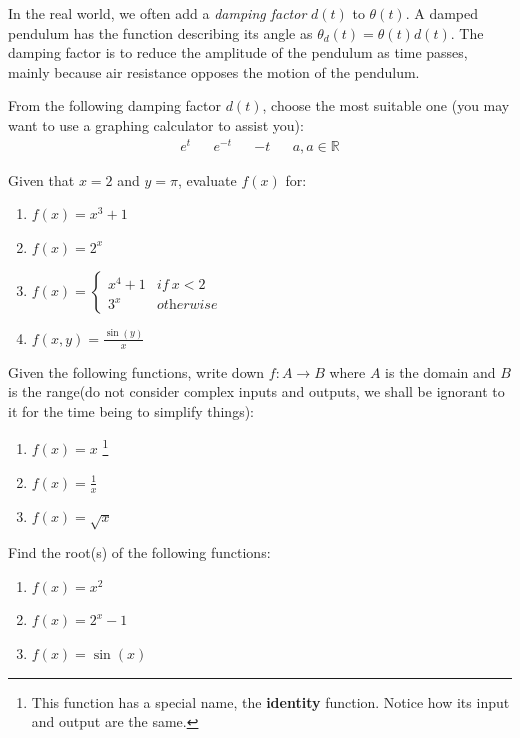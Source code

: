 In the real world, we often add a \textit{damping factor} \(d(t)\) to \(\theta(t)\). A damped pendulum has the function describing its angle as \(\theta_d(t)=\theta(t)d(t)\). The damping factor is to reduce the amplitude of the pendulum as time passes, mainly because air resistance opposes the motion of the pendulum. 
\begin{challenge}
  From the following damping factor \(d(t)\), choose the most suitable one (you may want to use a graphing calculator to assist you):
  \begin{align*}
    e^t && e^{-t} && -t && a, a\in \mathbb{R}
  \end{align*}
\end{challenge}

\begin{problem}
  Given that \(x=2\) and \(y=\pi\), evaluate \(f(x)\) for:
  \begin{enumerate}[label=\alph*)]
    \item{\(f(x)=x^3+1\)}
    \item{\(f(x)=2^x\)}
    \item{\(f(x)= \begin{cases}
        x^4+1 & \textit{if} \ x<2 \\
        3^x & \textit{otherwise}
    \end{cases}\)}
  \item{\(f(x,y)=\frac{\sin(y)}{x}\)}
  \end{enumerate}

\end{problem}
\begin{problem}
  Given the following functions, write down \(f:A \to B\) where \(A\) is the domain and \(B\) is the range(do not consider complex inputs and outputs, we shall be ignorant to it for the time being to simplify things):
  \begin{enumerate}[label=\alph*)]
    \item{\(f(x)=x\) \footnote{This function has a special name, the \textbf{identity} function. Notice how its input and output are the same.}}
    \item{\(f(x)=\frac{1}{x}\)}
    \item{\(f(x)=\sqrt{x}\)}
  \end{enumerate}

\end{problem}
\begin{problem}
  Find the root(s) of the following functions:
  \begin{enumerate}[label=\alph*)]
    \item{\(f(x)=x^2\)} 
    \item{\(f(x)=2^x-1\)}
    \item{\(f(x)=\sin(x)\)}
  \end{enumerate}
\end{problem}


